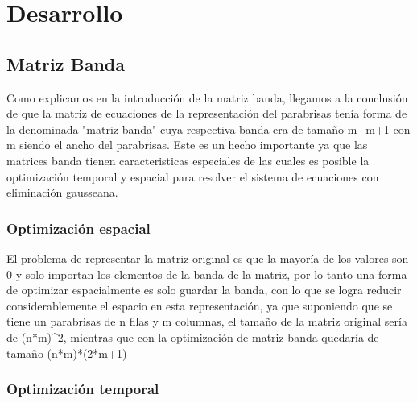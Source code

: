 \section{Desarrollo}

\subsection{Matriz Banda}

Como explicamos en la introducción de la matriz banda, llegamos a la conclusión de que la matriz de ecuaciones de la representación del parabrisas tenía forma de la denominada "matriz banda" cuya respectiva banda era de tamaño m+m+1 con m siendo el ancho del parabrisas. Este es un hecho importante ya que las matrices banda tienen caracteristicas especiales de las cuales es posible la optimización temporal y espacial para resolver el sistema de ecuaciones con eliminación gausseana.

\subsubsection{Optimización espacial}

El problema de representar la matriz original es que la mayoría de los valores son 0 y solo importan los elementos de la banda de la matriz, por lo tanto una forma de optimizar espacialmente es solo guardar la banda, con lo que se logra reducir considerablemente el espacio en esta representación, ya que suponiendo que se tiene un parabrisas de n filas y m columnas, el tamaño de la matriz original sería de (n*m)^2, mientras que con la optimización de matriz banda quedaría de tamaño (n*m)*(2*m+1)

\subsubsection{Optimización temporal}
